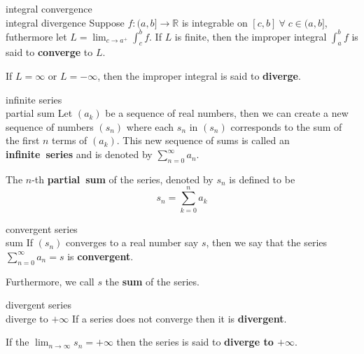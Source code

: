 \documentclass[avery5371,grid]{flashcards}
\newcommand{\R}{\mathbb{R}}
\begin{document}
\begin{flashcard}[Definition]{integral convergence \\
integral divergence}
Suppose $f:(a,b] \rightarrow \R$ is integrable on
$[c,b] \ \forall \; c \in (a,b]$, futhermore let
$L=\lim_{c \rightarrow a^{+}} \int_c^b f$.  If $L$ is finite, then
the improper integral $\int_a^b f$ is said to \mbox{\textbf{converge}}
to $L$.

\medskip
If $L=\infty$ or $L=-\infty$, then the improper integral is said to 
\mbox{\textbf{diverge}}.
\end{flashcard}

\begin{flashcard}[Definition]{infinite series\\ partial sum}
Let $(a_k)$ be a sequence of real numbers, then we can create a new
sequence of numbers $(s_n)$ where each $s_n$ in $(s_n)$ corresponds to
the sum of the first $n$ terms of $(a_k)$.  This new sequence of sums is
called an \mbox{\textbf{infinite series}} and is denoted by
$\displaystyle \sum_{n=0}^{\infty} a_n$.

\smallskip
The $n$-th \mbox{\textbf{partial sum}} of the series, denoted by $s_n$
is defined to be
\begin{equation*}
s_n = \sum_{k=0}^{n} a_k
\end{equation*}
\end{flashcard}

\begin{flashcard}[Definition]{convergent series\\ sum}
If $(s_n)$ converges to a real number say $s$, then we say that the
series $\displaystyle \sum_{n=0}^{\infty} a_n = s$ is
\mbox{\textbf{convergent}}.

\medskip
Furthermore, we call $s$ the \mbox{\textbf{sum}} of the series.
\end{flashcard}

\begin{flashcard}[Definition]{divergent series\\ diverge to $+\infty$}
If a series does not converge then it is \mbox{\textbf{divergent}}.

\medskip
If the $\displaystyle \lim_{n\rightarrow \infty} s_n = +\infty$ then
the series is said to \textbf{diverge to $+\infty$}.
\end{flashcard}
\end{document}
